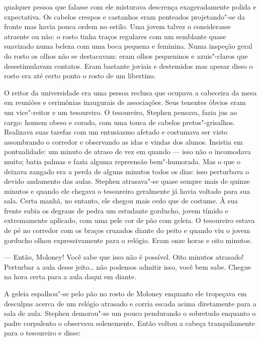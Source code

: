 {
\par}
\bigskip

\noindent qualquer pessoa que falasse com ele misturava descrença exageradamente
polida e expectativa.  \label{os"-cabelos} Os cabelos crespos e castanhos eram
penteados projetando"-se da fronte mas havia pouca ordem no estilo. 
Uma jovem talvez o considerasse atraente ou não: o rosto tinha
traços regulares com um semblante quase suavizado numa beleza com uma boca pequena e
feminina. Numa inspeção geral do
rosto os olhos não se destacavam: eram olhos pequeninos e azuis"-claros
que desestimulavam contatos.  Eram bastante joviais e destemidos mas
apesar disso o rosto era até certo ponto o rosto de um libertino.

O reitor da universidade era uma pessoa reclusa que ocupava a
cabeceira da mesa em reuniões e cerimônias inaugurais de associações.
Seus tenentes óbvios eram um vice"-reitor e um tesoureiro.  O
tesoureiro, Stephen pensava, fazia jus ao cargo: homem obeso e corado,
com uma \label{touca"-de} touca de cabelos pretos"-grisalhos.  Realizava suas tarefas
com um entusiasmo afetado e costumava ser visto assombrando o corredor
e observando as idas e vindas dos alunos.  Insistia em pontualidade: um
minuto de atraso de vez em quando --- isso não o incomodava muito; batia
palmas e fazia alguma repreensão bem"-humorada.  Mas o que o deixava
zangado era a perda de alguns minutos todos os dias: isso perturbava o
devido andamento das aulas.  Stephen atrasava"-se quase sempre mais de
quinze minutos e quando ele chegava o tesoureiro geralmente
já havia voltado para sua sala.  Certa manhã, no entanto, ele chegou
mais cedo que de costume.  À sua frente subia os degraus de pedra um
estudante gorducho, jovem tímido e extremamente aplicado, com
uma pele cor de pão com geleia.  O tesoureiro estava de pé no corredor
com os braços cruzados diante do peito e quando viu o jovem gorducho
olhou expressivamente para o relógio.  Eram onze horas e oito minutos.

--- Então, Moloney!  Você sabe que isso não é possível.  Oito
minutos atrasado!  Perturbar a aula desse jeito\ldots{} não podemos admitir
isso, você bem sabe.  Chegue na hora certa para a aula daqui em diante.

A geleia espalhou"-se pelo pão no rosto de Moloney enquanto ele
tropeçava em desculpas acerca de um relógio atrasado e corria escada
acima diretamente para a sala de aula.  Stephen demorou"-se um pouco
pendurando o sobretudo enquanto o padre corpulento o observava
solenemente.  Então voltou a cabeça tranquilamente para o tesoureiro e
disse:

